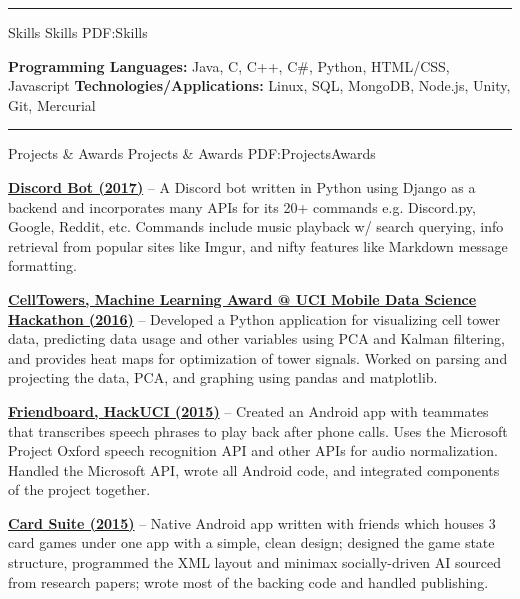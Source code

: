 \documentclass[letterpaper,MMMyyyy,nonstopmode]{simpleresumecv}
\begin{document}
\begin{Body}
\hrule


\Section
{Skills}
{Skills}
{PDF:Skills}

\begin{flushleft}
\textbf{Programming Languages:} Java, C, C++, C\#, Python, HTML/CSS, Javascript
\textbf{Technologies/Applications:} Linux, SQL, MongoDB, Node.js, Unity, Git, Mercurial\newline
\end{flushleft}

\hrule


\Section
{Projects \& Awards}
{Projects \& Awards}
{PDF:ProjectsAwards}

\Entry
\BulletItem
\href{https://github.com/SVT125/dingus-bot}
{\textbf{Discord Bot (2017)}} -- A Discord bot  written in Python using Django as a backend and incorporates many APIs for its 20+ commands e.g. Discord.py, Google, Reddit, etc. Commands include  music playback w/ search querying, info retrieval from popular sites like Imgur, and nifty features like Markdown message formatting.\newline

\Entry
\BulletItem
\href{https://github.com/trizzle21/Datathon2016}
{\textbf{CellTowers, Machine Learning Award @ UCI Mobile Data Science Hackathon (2016)}} -- Developed a Python application for visualizing cell tower data, predicting data usage and other variables using PCA and Kalman filtering, and provides heat maps for optimization of tower signals. Worked on parsing and projecting the data, PCA, and graphing using pandas and matplotlib.\newline

\Entry
\BulletItem
\href{https://github.com/SVT125/HackUCI2015}
{\textbf{Friendboard, HackUCI (2015)}} -- Created an Android app with teammates that transcribes speech phrases to play back after phone calls. Uses the Microsoft Project Oxford speech recognition API and other APIs for audio normalization. Handled the Microsoft API, wrote all Android code, and integrated components of the project together.\newline

\Entry
\BulletItem
\href{https://github.com/SVT125/GermanBridge}
{\textbf{Card Suite (2015)}} -- Native Android app written with friends which houses 3 card games  under one app with a simple, clean design; designed the game state structure, programmed the XML layout and minimax socially-driven AI sourced from research papers; wrote most of the backing code and handled publishing.\newline


\end{Body}
\end{document}
